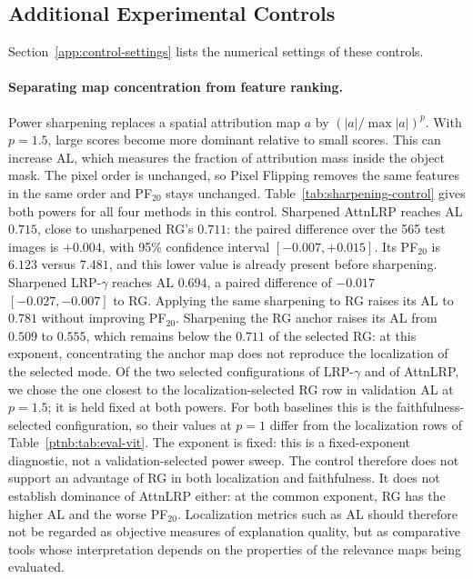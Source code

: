 \subsection{Additional Experimental Controls}\label{sec:additional-controls}

Section~\ref{app:control-settings} lists the numerical settings of these controls.

\paragraph{Separating map concentration from feature ranking.}
Power sharpening replaces a spatial attribution map $a$ by $(|a|/\max|a|)^p$. With $p=1.5$, large scores become more dominant relative to small scores. This can increase AL, which measures the fraction of attribution mass inside the object mask. The pixel order is unchanged, so Pixel Flipping removes the same features in the same order and PF$_{20}$ stays unchanged. Table~\ref{tab:sharpening-control} gives both powers for all four methods in this control. Sharpened AttnLRP reaches AL $0.715$, close to unsharpened RG's $0.711$: the paired difference over the 565 test images is $+0.004$, with 95\% confidence interval $[-0.007,+0.015]$. Its PF$_{20}$ is $6.123$ versus $7.481$, and this lower value is already present before sharpening. Sharpened LRP-$\gamma$ reaches AL $0.694$, a paired difference of $-0.017$ $[-0.027,-0.007]$ to RG. Applying the same sharpening to RG raises its AL to $0.781$ without improving PF$_{20}$. Sharpening the RG anchor raises its AL from $0.509$ to $0.555$, which remains below the $0.711$ of the selected RG: at this exponent, concentrating the anchor map does not reproduce the localization of the selected mode. Of the two selected configurations of LRP-$\gamma$ and of AttnLRP, we chose the one closest to the localization-selected RG row in validation AL at $p=1.5$; it is held fixed at both powers. For both baselines this is the faithfulness-selected configuration, so their values at $p=1$ differ from the localization rows of Table~\ref{ptnb:tab:eval-vit}. The exponent is fixed: this is a fixed-exponent diagnostic, not a validation-selected power sweep. The control therefore does not support an advantage of RG in both localization and faithfulness. It does not establish dominance of AttnLRP either: at the common exponent, RG has the higher AL and the worse PF$_{20}$. Localization metrics such as AL should therefore not be regarded as objective measures of explanation quality, but as comparative tools whose interpretation depends on the properties of the relevance maps being evaluated.

